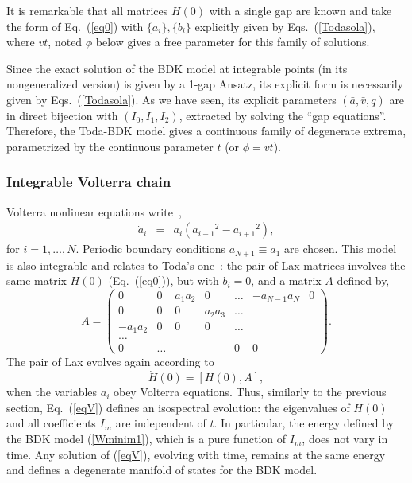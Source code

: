 \documentclass[]{revtex4-1}
\begin{document}
It is remarkable that all matrices $H(0)$ with a single gap are known and take the form of Eq.~(\ref{eq0}) with $\{a_i\}, \{b_i\}$ explicitly given  by Eqs.~(\ref{Todasola}), where $vt$, noted $\phi$ below gives a free parameter for this family of solutions.

Since the exact solution of the BDK model at integrable points (in its nongeneralized version) is given by a 1-gap Ansatz, its explicit form is necessarily given by Eqs.~(\ref{Todasola}). As we have seen, its explicit parameters $(\bar{a},\bar{v},q)$ are in direct bijection with $(I_0,I_1,I_2)$, extracted by solving the ``gap equations''. Therefore, the Toda-BDK model gives a continuous family of degenerate extrema, parametrized by the continuous parameter $t$ (or $\phi=vt$).

\subsubsection{Integrable Volterra chain}
\label{Volterrasection}

Volterra nonlinear equations  write~\cite{Moser},
\begin{eqnarray}
  \dot{a}_i &=& a_i({a_{i-1}}^2-{a_{i+1}}^2), \label{eqV}
 \end{eqnarray}
for $i=1,\dots,N$.  Periodic boundary conditions $a_{N+1} \equiv a_1$ are chosen. This model is also integrable and relates to Toda's one~\cite{Moser}: the pair of Lax matrices involves the same matrix $H(0)$ (Eq.~(\ref{eq0})), but with $b_i=0$, and a matrix $A$ defined by,
\begin{equation}
 A= \begin{pmatrix}
    0 & 0 & a_1a_2 & 0 &\dots &  -a_{N-1}a_{N} & 0 \\
    0 & 0 & 0 & a_2a_3  & \dots \\
    -a_1a_2 & 0 & 0 & 0 & \dots \\
    \dots \\
    0 & \dots & & &  0 &  0
  \end{pmatrix}.
\end{equation}
The pair of Lax evolves again according to 
\begin{equation}
\dot{H}(0)=[H(0),A],
\end{equation}
when the variables $a_i$ obey Volterra equations.
Thus, similarly to the previous section,  Eq.~(\ref{eqV}) defines an isospectral evolution: the eigenvalues of $H(0)$ and all coefficients $I_m$ are independent of $t$.
In particular, the energy defined by the BDK model (\ref{Wminim1}), which is a pure function of $I_m$, does not vary in time. Any solution of (\ref{eqV}), evolving with time, remains at the same energy and defines a degenerate manifold of states for the BDK model.
\end{document}
